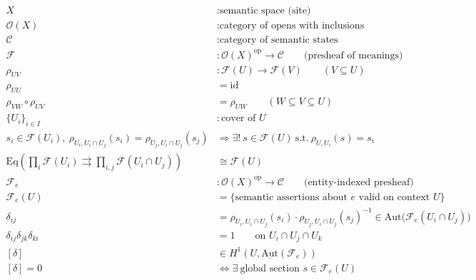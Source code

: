 \documentclass[11pt,oneside]{article}
\begin{document}
\begin{align}
X &: \text{semantic space (site)} \\[4pt]
\mathcal{O}(X) &: \text{category of opens with inclusions} \\[10pt]

\mathcal{C} &: \text{category of semantic states} \\[10pt]

\mathcal{F} &: \mathcal{O}(X)^{\mathrm{op}} \to \mathcal{C} \qquad \text{(presheaf of meanings)} \\[12pt]

\rho_{UV} &: \mathcal{F}(U) \to \mathcal{F}(V) \qquad (V\subseteq U) \\[10pt]

\rho_{UU} &= \mathrm{id} \\[6pt]
\rho_{VW}\circ \rho_{UV} &= \rho_{UW} \qquad (W\subseteq V\subseteq U) \\[14pt]

\{U_i\}_{i\in I} &: \text{cover of } U \\[10pt]

s_i \in \mathcal{F}(U_i),\ \rho_{U_i,U_i\cap U_j}(s_i)=\rho_{U_j,U_i\cap U_j}(s_j)
&\Longrightarrow
\exists!\ s\in \mathcal{F}(U)\ \text{s.t.}\ \rho_{U,U_i}(s)=s_i
\\[14pt]

\mathrm{Eq}\!\left(
\prod_i \mathcal{F}(U_i)
\rightrightarrows
\prod_{i,j}\mathcal{F}(U_i\cap U_j)
\right)
&\cong
\mathcal{F}(U)
\\[16pt]

\mathcal{F}_e &: \mathcal{O}(X)^{\mathrm{op}} \to \mathcal{C} \qquad \text{(entity-indexed presheaf)} \\[10pt]

\mathcal{F}_e(U)
&=
\{ \text{semantic assertions about $e$ valid on context $U$} \}
\\[12pt]

\delta_{ij}
&=
\rho_{U_i,U_i\cap U_j}(s_i)\cdot
\rho_{U_j,U_i\cap U_j}(s_j)^{-1}
\in
\mathrm{Aut}\big(\mathcal{F}_e(U_i\cap U_j)\big)
\\[14pt]

\delta_{ij}\delta_{jk}\delta_{ki}
&=
1
\qquad \text{on } U_i\cap U_j\cap U_k
\\[14pt]

[\delta]
&\in
H^1\!\left(U,\underline{\mathrm{Aut}}(\mathcal{F}_e)\right)
\\[14pt]

[\delta]=0
&\Longleftrightarrow
\exists\ \text{global section } s\in \mathcal{F}_e(U)
\\[16pt]


\end{align}
\end{document}
